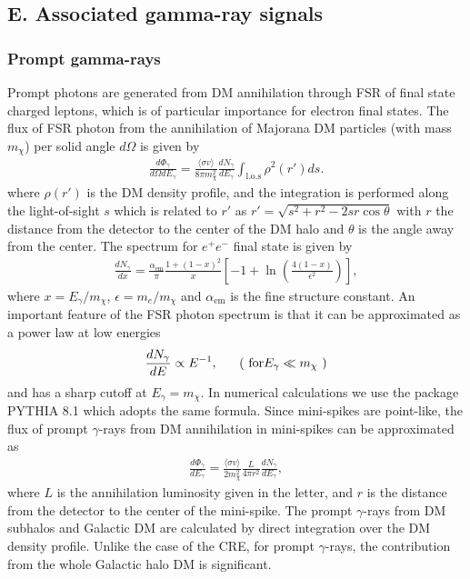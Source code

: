 \subsection{E. Associated gamma-ray signals}
\subsubsection{Prompt gamma-rays}
Prompt photons are generated from DM annihilation through FSR of final 
state charged leptons, which is of particular importance for electron final states.
The flux of FSR photon from the annihilation of Majorana DM particles (with mass $m_{\chi}$)
per solid angle $d\Omega$ is given by
\begin{align}
\frac{d\Phi_{\gamma}}{d\Omega dE_{\gamma}}
=
\frac{\langle \sigma v \rangle}{8\pi m_{\chi}^{2}} 
\frac{dN_{\gamma}}{dE_{\gamma}}
\int_{\text{l.o.s}} \rho^{2}(r') ds  .
\end{align}
where $\rho(r')$ is the DM density profile,
and the integration is performed along the light-of-sight $s$ which is related to $r'$ as
$r'=\sqrt{s^{2}+r^{2}-2 s r \cos\theta}$ with $r$ the distance from the detector to the center of the DM halo
and $\theta$ is the angle away from the center.
The spectrum  for $e^{+}e^{-}$ final state is given by
\begin{align}
\frac{dN_{\gamma}}{d x}
=
\frac{\alpha_{\text{em}}}{\pi}
\frac{1+(1-x)^{2}}{x}
\left[ 
	-1+
	\ln\left( \frac{4(1-x)}{\epsilon^{2}}\right)
\right]  ,
\end{align} 
where  $x=E_{\gamma}/m_{\chi}$, $\epsilon=m_{e}/m_{\chi}$ and
$\alpha_{\text{em}}$ is the fine structure constant.
An important feature of the FSR photon spectrum is that 
it can be approximated as a power law at low energies
\begin{align}
\frac{dN_{\gamma}}{d E}\propto E^{-1}, 
\ \ \ \ \ (~\text{for} E_{\gamma}\ll m_{\chi}~)
\end{align}
and has a sharp cutoff at $E_{\gamma}=m_{\chi}$.
In numerical calculations we use the package PYTHIA 8.1 which 
adopts the same formula.
Since mini-spikes are point-like, 
the flux of prompt $\gamma$-rays from DM annihilation in mini-spikes 
can be approximated as
\begin{align}
\frac{d\Phi_{\gamma}}{dE_{\gamma}}=
\frac{\langle\sigma v\rangle}{2 m_{\chi}^{2}} \frac{L}{4\pi r^{2}}
\frac{dN_{\gamma}}{dE_{\gamma}} ,
\end{align}
where $L$ is the annihilation luminosity given in the letter,
and $r$ is the distance from the detector to the center of the mini-spike.
The prompt $\gamma$-rays from DM subhalos  and Galactic DM are calculated by
direct integration over the DM density profile.
Unlike the case of the CRE, for prompt $\gamma$-rays, the contribution from the 
whole Galactic halo  DM is significant. 









